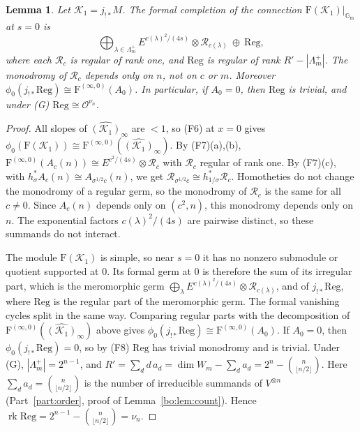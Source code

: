 \documentclass[11pt,a4paper]{article}
\newtheorem{lemma}[theorem]{Lemma}
\theoremstyle{definition}
\theoremstyle{remark}
\numberwithin{equation}{section}
\newcommand{\Gm}{\mathbb{G}_{\mathrm{m}}}
\newcommand{\cO}{\mathcal{O}}
\newcommand{\Four}{\mathrm{F}}
\DeclareMathOperator{\rk}{rk}
\newcommand{\cK}{\mathcal{K}}
\begin{document}
\begin{lemma}\label{bs:lem:F0}
Let $\cK_1=j_{!*}M$. The formal completion of the connection $\Four(\cK_1)|_{\Gm}$ at $s=0$ is
\[
\bigoplus_{\lambda\in\Lambda_m^+}E^{c(\lambda)^2/(4s)}\otimes \mathcal R_{c(\lambda)}\ \oplus\ \mathrm{Reg},
\]
where each $\mathcal R_c$ is regular of rank one, and $\mathrm{Reg}$ is regular of rank $R'-|\Lambda_m^+|$. The monodromy of $\mathcal R_c$ depends only on $n$, not on $c$ or $m$. Moreover $\phi_0(j_{!*}\mathrm{Reg})\cong\Four^{(\infty,0)}(A_0)$. In particular, if $A_0=0$, then $\mathrm{Reg}$ is trivial, and under {\rm(G)} $\mathrm{Reg}\cong\cO^{\nu_n}$.
\end{lemma}

\begin{proof}
All slopes of $\widehat{(\cK_1)}_\infty$ are $<1$, so (F6) at $x=0$ gives $\phi_0(\Four(\cK_1))\cong\Four^{(\infty,0)}(\widehat{(\cK_1)}_\infty)$. By (F7)(a),(b), $\Four^{(\infty,0)}(A_c(n))\cong E^{c^2/(4s)}\otimes \mathcal R_c$ with $\mathcal R_c$ regular of rank one. By (F7)(c), with $h_\sigma^*A_c(n)\cong A_{\sigma^{1/2}c}(n)$, we get $\mathcal R_{\sigma^{1/2}c}\cong h_{1/\sigma}^*\mathcal R_c$. Homotheties do not change the monodromy of a regular germ, so the monodromy of $\mathcal R_c$ is the same for all $c\ne0$. Since $A_c(n)$ depends only on $(c^2,n)$, this monodromy depends only on $n$. The exponential factors $c(\lambda)^2/(4s)$ are pairwise distinct, so these summands do not interact.

The module $\Four(\cK_1)$ is simple, so near $s=0$ it has no nonzero submodule or quotient supported at $0$. Its formal germ at $0$ is therefore the sum of its irregular part, which is the meromorphic germ $\bigoplus_\lambda E^{c(\lambda)^2/(4s)}\otimes \mathcal R_{c(\lambda)}$, and of $j_{!*}\mathrm{Reg}$, where $\mathrm{Reg}$ is the regular part of the meromorphic germ. The formal vanishing cycles split in the same way. Comparing regular parts with the decomposition of $\Four^{(\infty,0)}(\widehat{(\cK_1)}_\infty)$ above gives $\phi_0(j_{!*}\mathrm{Reg})\cong\Four^{(\infty,0)}(A_0)$. If $A_0=0$, then $\phi_0(j_{!*}\mathrm{Reg})=0$, so by (F8) $\mathrm{Reg}$ has trivial monodromy and is trivial. Under (G), $|\Lambda_m^+|=2^{n-1}$, and $R'=\sum_dd\,a_d=\dim W_m-\sum_da_d=2^n-\binom n{\lfloor n/2\rfloor}$. Here $\sum_da_d=\binom n{\lfloor n/2\rfloor}$ is the number of irreducible summands of $V^{\otimes n}$ (Part~\ref{part:order}, proof of Lemma~\ref{bo:lem:count}). Hence $\rk\mathrm{Reg}=2^{n-1}-\binom n{\lfloor n/2\rfloor}=\nu_n$.
\end{proof}
\end{document}
